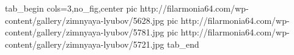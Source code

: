  
 
 
 
 


\ifcmt
  tab_begin cols=3,no_fig,center
     pic http://filarmonia64.com/wp-content/gallery/zimnyaya-lyubov/5628.jpg
		 pic http://filarmonia64.com/wp-content/gallery/zimnyaya-lyubov/5781.jpg
		 pic http://filarmonia64.com/wp-content/gallery/zimnyaya-lyubov/5721.jpg
  tab_end
\fi
